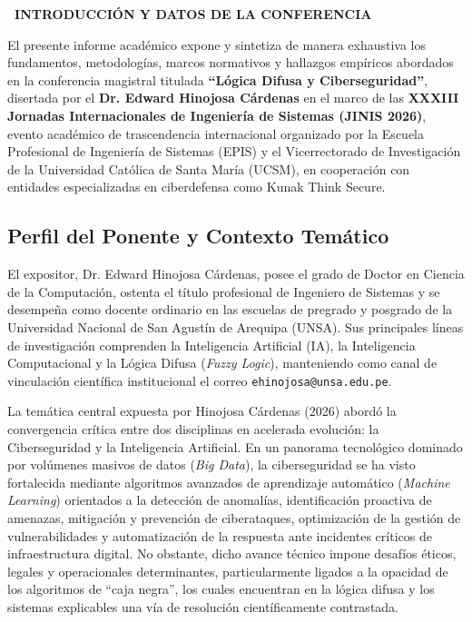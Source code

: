\documentclass[12pt,a4paper]{article}
\newcommand{\llav}{\symbol{60}\symbol{60}}
\newcommand{\rlav}{\symbol{62}\symbol{62}}
\newcommand{\marcador}[1]{\llav\ #1\ \rlav}
\newcommand{\seccion}[1]{%
  \vspace{0.65cm}%
  {\centering\bfseries\fontsize{12pt}{14pt}\selectfont\marcador{\MakeUppercase{#1}}\par}%
  \vspace{0.30cm}%
}
\begin{document}
\vspace{0.4cm}


\seccion{INTRODUCCIÓN Y DATOS DE LA CONFERENCIA}

El presente informe académico expone y sintetiza de manera exhaustiva los fundamentos, metodologías, marcos normativos y hallazgos empíricos abordados en la conferencia magistral titulada \textbf{``Lógica Difusa y Ciberseguridad''}, disertada por el \textbf{Dr. Edward Hinojosa Cárdenas} en el marco de las \textbf{XXXIII Jornadas Internacionales de Ingeniería de Sistemas (JINIS 2026)}, evento académico de trascendencia internacional organizado por la Escuela Profesional de Ingeniería de Sistemas (EPIS) y el Vicerrectorado de Investigación de la Universidad Católica de Santa María (UCSM), en cooperación con entidades especializadas en ciberdefensa como Kunak Think Secure.

\subsection*{Perfil del Ponente y Contexto Temático}
El expositor, Dr. Edward Hinojosa Cárdenas, posee el grado de Doctor en Ciencia de la Computación, ostenta el título profesional de Ingeniero de Sistemas y se desempeña como docente ordinario en las escuelas de pregrado y posgrado de la Universidad Nacional de San Agustín de Arequipa (UNSA). Sus principales líneas de investigación comprenden la Inteligencia Artificial (IA), la Inteligencia Computacional y la Lógica Difusa (\textit{Fuzzy Logic}), manteniendo como canal de vinculación científica institucional el correo \texttt{ehinojosa@unsa.edu.pe}.

La temática central expuesta por Hinojosa Cárdenas (2026) abordó la convergencia crítica entre dos disciplinas en acelerada evolución: la Ciberseguridad y la Inteligencia Artificial. En un panorama tecnológico dominado por volúmenes masivos de datos (\textit{Big Data}), la ciberseguridad se ha visto fortalecida mediante algoritmos avanzados de aprendizaje automático (\textit{Machine Learning}) orientados a la detección de anomalías, identificación proactiva de amenazas, mitigación y prevención de ciberataques, optimización de la gestión de vulnerabilidades y automatización de la respuesta ante incidentes críticos de infraestructura digital. No obstante, dicho avance técnico impone desafíos éticos, legales y operacionales determinantes, particularmente ligados a la opacidad de los algoritmos de ``caja negra'', los cuales encuentran en la lógica difusa y los sistemas explicables una vía de resolución científicamente contrastada.
\end{document}

